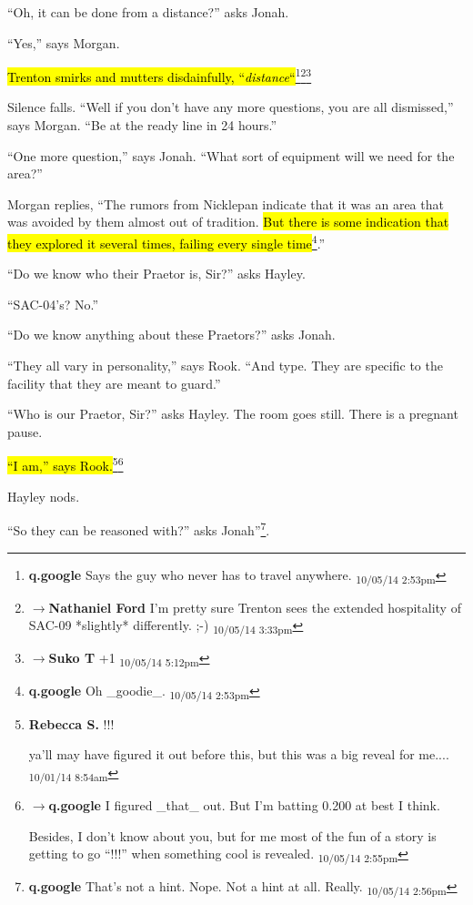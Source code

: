 ``Oh, it can be done from a distance?'' asks Jonah.

``Yes,'' says Morgan.  

\hl{Trenton smirks and mutters disdainfully, ``\textit{distance}``}\footnote{\textbf{q.google }Says the guy who never has to travel anywhere. \textsubscript{10/05/14 2:53pm}}\footnote{$\rightarrow$\textbf{Nathaniel Ford }I'm pretty sure Trenton sees the extended hospitality of SAC-09 *slightly* differently. ;-) \textsubscript{10/05/14 3:33pm}}\footnote{$\rightarrow$\textbf{Suko T }+1 \textsubscript{10/05/14 5:12pm}}

Silence falls.  ``Well if you don't have any more questions, you are all dismissed,'' says Morgan.  ``Be at the ready line in 24 hours.''

``One more question,'' says Jonah.  ``What sort of equipment will we need for the area?''

Morgan replies, ``The rumors from Nicklepan indicate that it was an area that was avoided by them almost out of tradition.  \hl{But there is some indication that they explored it several times, failing every single time}\footnote{\textbf{q.google }Oh \_goodie\_. \textsubscript{10/05/14 2:53pm}}.'' 

``Do we know who their Praetor is, Sir?'' asks Hayley.

``SAC-04's?  No.''

``Do we know anything about these Praetors?'' asks Jonah.

``They all vary in personality,'' says Rook. ``And type.  They are specific to the facility that they are meant to guard.''

``Who is our Praetor, Sir?'' asks Hayley.  The room goes still. There is a pregnant pause.

\hl{``I am,'' says Rook.}\footnote{\textbf{Rebecca S. }!!!

ya'll may have figured it out before this, but this was a big reveal for me.... \textsubscript{10/01/14 8:54am}}\footnote{$\rightarrow$\textbf{q.google }I figured \_that\_ out.  But I'm batting 0.200 at best I think.

Besides, I don't know about you, but for me most of the fun of a story is getting to go ``!!!'' when something cool is revealed. \textsubscript{10/05/14 2:55pm}}

Hayley nods.

``So they can be reasoned with?'' asks Jonah''\footnote{\textbf{q.google }That's not a hint.  Nope.  Not a hint at all.  Really. \textsubscript{10/05/14 2:56pm}}.  

